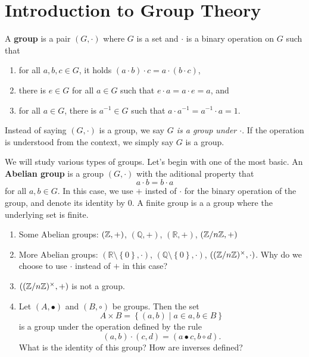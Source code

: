 \documentclass[11pt,a4paper]{article}
\begin{document}
\def\contador{Lesson 3}


\section{Introduction to Group Theory}

\begin{defi}
    A \textbf{group} is a pair  \(\left( G, \cdot \right)\) where \(G\) is a set and \(\cdot\) is a binary  operation on \(G\) such that 
    \begin{enumerate}[label=(\roman*)]
        \item for all \(a,b,c\in G\), it holds  \((a\cdot b) \cdot c = a \cdot (b\cdot c) \),
        \item there is \(e\in G\)  for all \(a\in G\) such that \(e\cdot a = a\cdot e = a\), and 
        \item for all \(a\in G\), there is \(a^{-1}\in G\) such that \(a\cdot a^{-1} = a^{-1}\cdot a = 1\).
    \end{enumerate}
\end{defi}


Instead of saying \((G,\cdot)\) is a group, we say \textit{\(G\) is a group under \(\cdot\)}.
If the operation is understood from the context, we simply say \(G\) is a group.


We will study various types of groups.
Let's begin with one of the most basic.
An \textbf{Abelian group} is a group \(\left( G, \cdot \right)\) with the aditional property that 
\[a\cdot b = b\cdot a \]
for all \(a,b\in G\).
In this case, we use \(+\) insted of \(\cdot\) for the binary operation of the group, and denote its identity by \(0\).
A finite group is a a group where the underlying set is finite.

\begin{exa}
\begin{enumerate}[label=(\roman*)]
    \item Some Abelian groups: \(\left( \mathbb{Z}, + \right)\), \(\left( \mathbb{Q}, + \right)\), \(\left( \mathbb{R}, + \right)\),   \(\left( \mathbb{Z}/n\mathbb{Z} , +\right)\)
    \item More Abelian groups: \(\left( \mathbb{R}\setminus\left\{ 0 \right\}, \cdot \right)\), \(\left( \mathbb{Q}\setminus\left\{ 0 \right\}, \cdot \right)\), \(\left( (\mathbb{Z}/n\mathbb{Z})^\times , \cdot\right)\). Why do we choose to use \(\cdot\) instead of \(+\) in this case?
    
    \item \(\left( (\mathbb{Z}/n\mathbb{Z})^\times , +\right)\) is not a group.
    \item Let \((A, \bullet)\) and \((B, \circ)\) be groups.
    Then the set 
    \[A\times B = \left\{ (a,b)\mid a\in a, b\in B \right\}\]
    is a group under the operation defined by the rule 
    \[(a,b)\cdot(c,d)  = (a\bullet c, b\circ d).\]
    What is the identity of this group? How are inverses defined?
\end{enumerate}
\end{exa}
\end{document}
